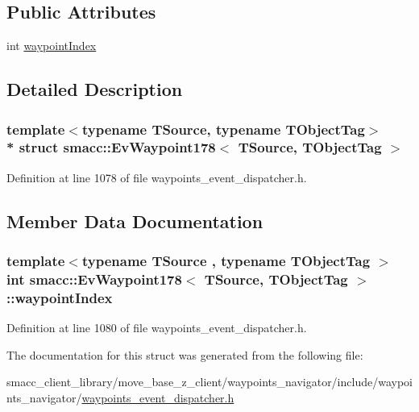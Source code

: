 \subsection*{Public Attributes}
\begin{DoxyCompactItemize}
\item 
int \hyperlink{structsmacc_1_1EvWaypoint178_a0d2ffd50cb6ee627ba69c0b834ff2f0a}{waypoint\+Index}
\end{DoxyCompactItemize}


\subsection{Detailed Description}
\subsubsection*{template$<$typename T\+Source, typename T\+Object\+Tag$>$\\*
struct smacc\+::\+Ev\+Waypoint178$<$ T\+Source, T\+Object\+Tag $>$}



Definition at line 1078 of file waypoints\+\_\+event\+\_\+dispatcher.\+h.



\subsection{Member Data Documentation}
\subsubsection[{\texorpdfstring{waypoint\+Index}{waypointIndex}}]{\setlength{\rightskip}{0pt plus 5cm}template$<$typename T\+Source , typename T\+Object\+Tag $>$ int {\bf smacc\+::\+Ev\+Waypoint178}$<$ T\+Source, T\+Object\+Tag $>$\+::waypoint\+Index}\hypertarget{structsmacc_1_1EvWaypoint178_a0d2ffd50cb6ee627ba69c0b834ff2f0a}{}\label{structsmacc_1_1EvWaypoint178_a0d2ffd50cb6ee627ba69c0b834ff2f0a}


Definition at line 1080 of file waypoints\+\_\+event\+\_\+dispatcher.\+h.



The documentation for this struct was generated from the following file\+:\begin{DoxyCompactItemize}
\item 
smacc\+\_\+client\+\_\+library/move\+\_\+base\+\_\+z\+\_\+client/waypoints\+\_\+navigator/include/waypoints\+\_\+navigator/\hyperlink{waypoints__event__dispatcher_8h}{waypoints\+\_\+event\+\_\+dispatcher.\+h}\end{DoxyCompactItemize}
